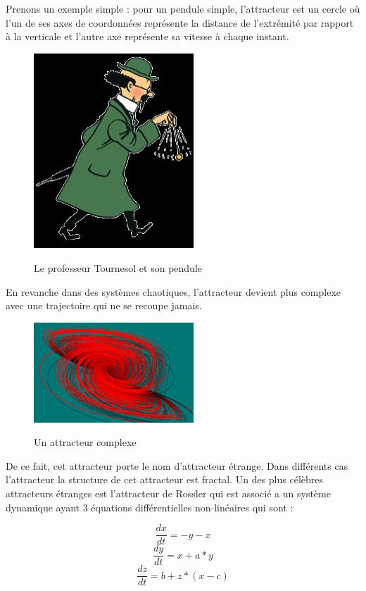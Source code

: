 \documentclass[french,11pt]{report}
\begin{document}
\begin{enumerate}
    Prenons un exemple simple : pour un pendule simple, l’attracteur est un cercle où l’un de ses axes de coordonnées représente la distance de l’extrémité par rapport à la verticale et l’autre axe représente sa vitesse à chaque instant.
    \begin{figure} [!h]
        \centering
        \includegraphics[width=6cm]{pendule_tournesol}
        \label{fig:pendule_tournesol}
        \caption{Le professeur Tournesol et son pendule}
    \end{figure}
    
    En revanche dans des systèmes chaotiques, l’attracteur devient plus complexe avec une trajectoire qui ne se recoupe jamais. 
    \begin{figure} [!h]
        \centering
        \includegraphics[width=6cm]{attracteur_complexe}
        \label{fig:attracteur_complexe}
        \caption{Un attracteur complexe}
    \end{figure}
    
    De ce fait, cet attracteur porte le nom d’attracteur étrange. Dans différents cas l’attracteur la structure de cet attracteur est fractal.
    Un des plus célèbres attracteurs étranges est l’attracteur de Rossler qui est associé a un système dynamique ayant 3 équations différentielles non-linéaires qui sont :
    
    \begin{equation}
        \frac{dx}{dt} = - y - x
    \end{equation}
    \begin{equation}
        \frac{dy}{dt} = x + a * y
    \end{equation}
    \begin{equation}
        \frac{dz}{dt} = b + z * (x - c)
    \end{equation}
    

\end{enumerate}
\end{document}
